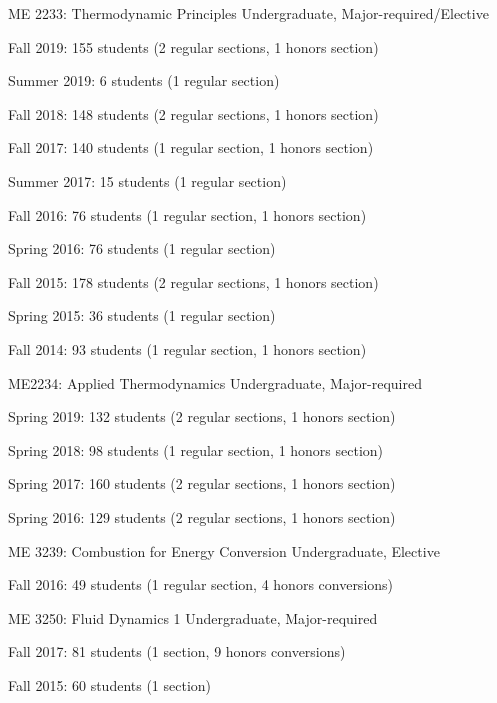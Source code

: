 \begin{outerlist}
\item ME 2233: Thermodynamic Principles \hfill Undergraduate, Major-required/Elective
\begin{innerlist}
    \item Fall 2019: 155 students (2 regular sections, 1 honors section)
    \item Summer 2019: 6 students (1 regular section)
    \item Fall 2018: 148 students (2 regular sections, 1 honors section)
    \item Fall 2017: 140 students (1 regular section, 1 honors section)
    \item Summer 2017: 15 students (1 regular section)
    \item Fall 2016: 76 students (1 regular section, 1 honors section)
    \item Spring 2016: 76 students (1 regular section)
    \item Fall 2015: 178 students (2 regular sections, 1 honors section)
    \item Spring 2015: 36 students (1 regular section)
    \item Fall 2014: 93 students (1 regular section, 1 honors section)
\end{innerlist}

\item ME2234: Applied Thermodynamics \hfill Undergraduate, Major-required
\begin{innerlist}
    \item Spring 2019: 132 students (2 regular sections, 1 honors section)
    \item Spring 2018: 98 students (1 regular section, 1 honors section)
    \item Spring 2017: 160 students (2 regular sections, 1 honors section)
    \item Spring 2016: 129 students (2 regular sections, 1 honors section)
\end{innerlist}

\item ME 3239: Combustion for Energy Conversion \hfill Undergraduate, Elective
\begin{innerlist}
    \item Fall 2016: 49 students (1 regular section, 4 honors conversions)
\end{innerlist}

\item ME 3250: Fluid Dynamics 1 \hfill Undergraduate, Major-required
\begin{innerlist}
    \item Fall 2017: 81 students (1 section, 9 honors conversions)
    \item Fall 2015: 60 students (1 section)
\end{innerlist}


\end{outerlist}
